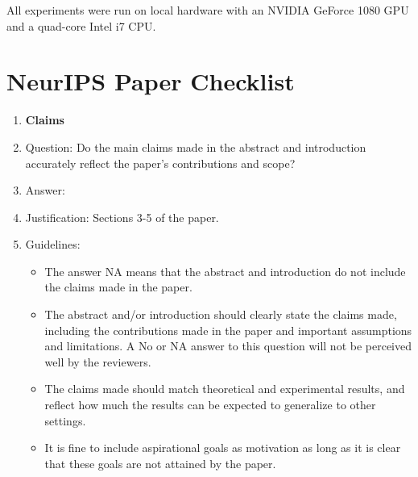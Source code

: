\documentclass{article}
\theoremstyle{plain}
\theoremstyle{definition}
\theoremstyle{remark}
\begin{document}
All experiments were run on local hardware with an NVIDIA GeForce 1080 GPU and a quad-core Intel i7 CPU. 


\newpage

\section*{NeurIPS Paper Checklist}

\begin{enumerate}

\item {\bf Claims}
    \item[] Question: Do the main claims made in the abstract and introduction accurately reflect the paper's contributions and scope?
    \item[] Answer: \answerYes{} %
    \item[] Justification: Sections 3-5 of the paper.
    \item[] Guidelines:
    \begin{itemize}
        \item The answer NA means that the abstract and introduction do not include the claims made in the paper.
        \item The abstract and/or introduction should clearly state the claims made, including the contributions made in the paper and important assumptions and limitations. A No or NA answer to this question will not be perceived well by the reviewers. 
        \item The claims made should match theoretical and experimental results, and reflect how much the results can be expected to generalize to other settings. 
        \item It is fine to include aspirational goals as motivation as long as it is clear that these goals are not attained by the paper. 
    \end{itemize}


\end{enumerate}
\end{document}
